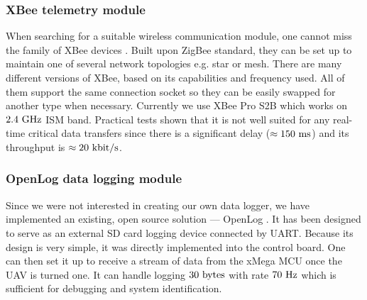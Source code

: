 \subsubsection{XBee telemetry module}

When searching for a suitable wireless communication module, one cannot miss the family of XBee devices \citep{xbee}. Built upon ZigBee standard, they can be set up to maintain one of several network topologies e.g. star or mesh. There are many different versions of XBee, based on its capabilities and frequency used. All of them support the same connection socket so they can be easily swapped for another type when necessary. Currently we use XBee Pro S2B which works on $2.4~\mathrm{GHz}$ ISM band. Practical tests shown that it is not well suited for any real-time critical data transfers since there is a significant delay ($\approx 150~\mathrm{ms}$)  and its throughput is $\approx 20~\mathrm{kbit/s}$.

\subsubsection{OpenLog data logging module}

Since we were not interested in creating our own data logger, we have implemented an existing, open source solution --- OpenLog \citep{openlog}. It has been designed to serve as an external SD card logging device connected by UART. Because its design is very simple, it was directly implemented into the control board. One can then set it up to receive a stream of data from the xMega MCU once the UAV is turned one. It can handle logging $30~\mathrm{bytes}$ with rate $70~\mathrm{Hz}$ which is sufficient for debugging and system identification.

\usetikzlibrary{shapes.geometric,backgrounds,calc}

